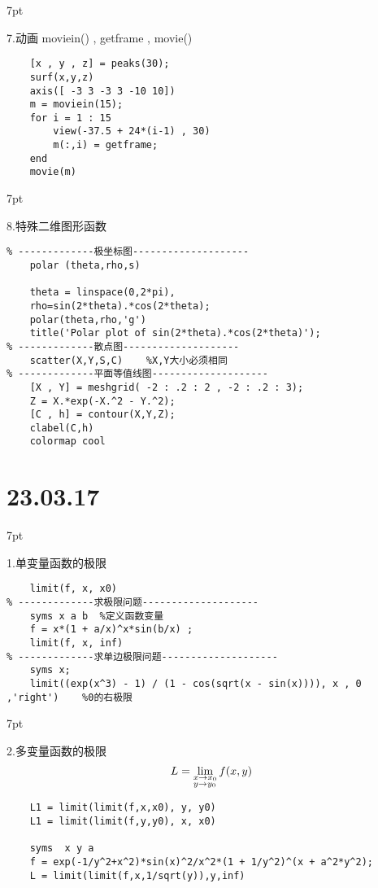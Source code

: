 \documentclass{article} %
\newenvironment{eg}{%
\def\FrameCommand{%
\hspace{1pt}%
{\color{Gray}\vrule width 2pt}%
{\color{egshade}\vrule width 4pt}%
\colorbox{egshade}%
}%
\MakeFramed{\advance\hsize-\width\FrameRestore}%
\noindent\hspace{-4.55pt}%
\begin{adjustwidth}{}{7pt}%
\vspace{2pt}\vspace{2pt}%
\normalfont %
}
{%
\vspace{2pt}\end{adjustwidth}\endMakeFramed%
}
\begin{document}
\begin{eg}
    7.动画 moviein() , getframe , movie() 
\end{eg}
\begin{lstlisting}
    [x , y , z] = peaks(30);         
    surf(x,y,z) 
    axis([ -3 3 -3 3 -10 10]) 
    m = moviein(15); 
    for i = 1 : 15 
        view(-37.5 + 24*(i-1) , 30) 
        m(:,i) = getframe; 
    end 
    movie(m)
\end{lstlisting}

\begin{eg}
    8.特殊二维图形函数
\end{eg}
\begin{lstlisting}
% -------------极坐标图--------------------
    polar (theta,rho,s) 

    theta = linspace(0,2*pi),                         
    rho=sin(2*theta).*cos(2*theta); 
    polar(theta,rho,'g') 
    title('Polar plot of sin(2*theta).*cos(2*theta)');
% -------------散点图--------------------
    scatter(X,Y,S,C)    %X,Y大小必须相同
% -------------平面等值线图--------------------
    [X , Y] = meshgrid( -2 : .2 : 2 , -2 : .2 : 3); 
    Z = X.*exp(-X.^2 - Y.^2); 
    [C , h] = contour(X,Y,Z); 
    clabel(C,h) 
    colormap cool 
\end{lstlisting}





\newpage
\noindent \Large \section*{23.03.17} \par \normalsize
\begin{eg}
    1.单变量函数的极限
\end{eg}
\begin{lstlisting}
    limit(f, x, x0)
% -------------求极限问题--------------------
    syms x a b  %定义函数变量
    f = x*(1 + a/x)^x*sin(b/x) ;
    limit(f, x, inf)
% -------------求单边极限问题--------------------
    syms x;
    limit((exp(x^3) - 1) / (1 - cos(sqrt(x - sin(x)))), x , 0 ,'right')    %0的右极限
\end{lstlisting}

\begin{eg}
    2.多变量函数的极限
    $$L = \lim_{
        \begin{subarray}{l} 
            x \to x_{0} \\ 
            y \to y_{0}
        \end{subarray} }  f(x,y)$$
\end{eg}
\begin{lstlisting}
    L1 = limit(limit(f,x,x0), y, y0)
    L1 = limit(limit(f,y,y0), x, x0)

    syms  x y a
    f = exp(-1/y^2+x^2)*sin(x)^2/x^2*(1 + 1/y^2)^(x + a^2*y^2);
    L = limit(limit(f,x,1/sqrt(y)),y,inf)
\end{lstlisting}
\end{document}
